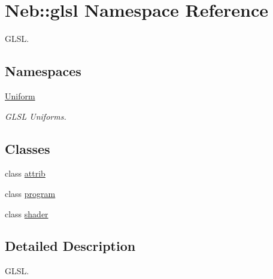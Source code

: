 \hypertarget{namespaceNeb_1_1glsl}{\section{Neb\-:\-:glsl Namespace Reference}
\label{namespaceNeb_1_1glsl}
}


G\-L\-S\-L.  


\subsection*{Namespaces}
\begin{DoxyCompactItemize}
\item 
\hyperlink{namespaceNeb_1_1glsl_1_1Uniform}{Uniform}
\begin{DoxyCompactList}\small\item\em G\-L\-S\-L Uniforms. \end{DoxyCompactList}\end{DoxyCompactItemize}
\subsection*{Classes}
\begin{DoxyCompactItemize}
\item 
class \hyperlink{classNeb_1_1glsl_1_1attrib}{attrib}
\item 
class \hyperlink{classNeb_1_1glsl_1_1program}{program}
\item 
class \hyperlink{classNeb_1_1glsl_1_1shader}{shader}
\end{DoxyCompactItemize}


\subsection{Detailed Description}
G\-L\-S\-L. 